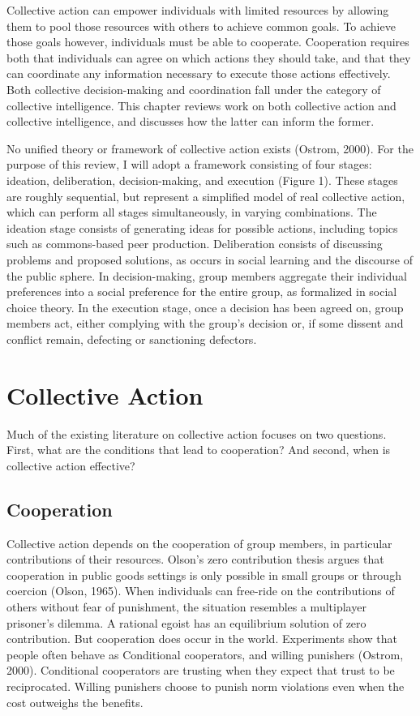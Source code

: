 Collective action can empower individuals with limited resources by allowing them to pool those resources with others to achieve common goals. To achieve those goals however, individuals must be able to cooperate. Cooperation requires both that individuals can agree on which actions they should take, and that they can coordinate any information necessary to execute those actions effectively. Both collective decision-making and coordination fall under the category of collective intelligence. This chapter reviews work on both collective action and collective intelligence, and discusses how the latter can inform the former.

No unified theory or framework of collective action exists (Ostrom, 2000). For the purpose of this review, I will adopt a framework consisting of four stages: ideation, deliberation, decision-making, and execution (Figure 1). These stages are roughly sequential, but represent a simplified model of real collective action, which can perform all stages simultaneously, in varying combinations. The ideation stage consists of generating ideas for possible actions, including topics such as commons-based peer production. Deliberation consists of discussing problems and proposed solutions, as occurs in social learning and the discourse of the public sphere. In decision-making, group members aggregate their individual preferences into a social preference for the entire group, as formalized in social choice theory. In the execution stage, once a decision has been agreed on, group members act, either complying with the group’s decision or, if some dissent and conflict remain, defecting or sanctioning defectors.

\section{Collective Action}
Much of the existing literature on collective action focuses on two questions. First, what are the conditions that lead to cooperation? And second, when is collective action effective?

\subsection{Cooperation}
Collective action depends on the cooperation of group members, in particular contributions of their resources. Olson's zero contribution thesis argues that cooperation in public goods settings is only possible in small groups or through coercion (Olson, 1965). When individuals can free-ride on the contributions of others without fear of punishment, the situation resembles a multiplayer prisoner’s dilemma. A rational egoist has an equilibrium solution of zero contribution. But cooperation does occur in the world. Experiments show that people often behave as Conditional cooperators, and willing punishers (Ostrom, 2000). Conditional cooperators are trusting when they expect that trust to be reciprocated. Willing punishers choose to punish norm violations even when the cost outweighs the benefits.

